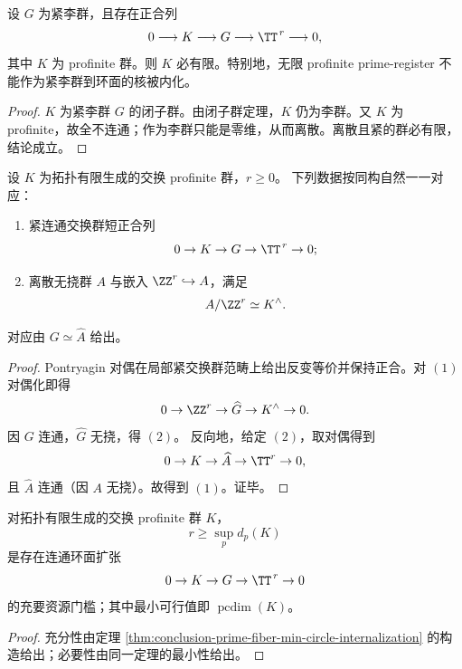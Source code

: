 

\begin{theorem}\label{thm:conclusion-compact-lie-profinite-kernel-obstruction}
设 \(G\) 为紧李群，且存在正合列
\[
0\longrightarrow K\longrightarrow G\longrightarrow \TT^{\,r}\longrightarrow 0,
\]
其中 \(K\) 为 profinite 群。则 \(K\) 必有限。特别地，无限 profinite prime-register 不能作为紧李群到环面的核被内化。
\end{theorem}
\begin{proof}
\(K\) 为紧李群 \(G\) 的闭子群。由闭子群定理，\(K\) 仍为李群。又 \(K\) 为 profinite，故全不连通；作为李群只能是零维，从而离散。离散且紧的群必有限，结论成立。
\end{proof}

\begin{theorem}\label{thm:conclusion-torus-extension-pontryagin-classification}
设 \(K\) 为拓扑有限生成的交换 profinite 群，\(r\ge 0\)。
下列数据按同构自然一一对应：
\begin{enumerate}
  \item 紧连通交换群短正合列
  \[
  0\to K\to G\to \TT^{\,r}\to 0;
  \]
  \item 离散无挠群 \(A\) 与嵌入 \(\ZZ^r\hookrightarrow A\)，满足
  \[
  A/\ZZ^r\simeq K^\wedge.
  \]
\end{enumerate}
对应由 \(G\simeq \widehat A\) 给出。
\end{theorem}
\begin{proof}
Pontryagin 对偶在局部紧交换群范畴上给出反变等价并保持正合。对 \((1)\) 对偶化即得
\[
0\to \ZZ^r\to \widehat G\to K^\wedge\to 0.
\]
因 \(G\) 连通，\(\widehat G\) 无挠，得 \((2)\)。
反向地，给定 \((2)\)，取对偶得到
\[
0\to K\to \widehat A\to \TT^r\to 0,
\]
且 \(\widehat A\) 连通（因 \(A\) 无挠）。故得到 \((1)\)。证毕。
\end{proof}

\begin{corollary}[圆维--素数剖面的资源边界完备性]\label{cor:conclusion-pcdim-resource-completeness}
对拓扑有限生成的交换 profinite 群 \(K\)，
\[
r\ge \sup_p d_p(K)
\]
是存在连通环面扩张
\[
0\to K\to G\to \TT^{\,r}\to 0
\]
的充要资源门槛；其中最小可行值即 \(\operatorname{pcdim}(K)\)。
\end{corollary}
\begin{proof}
充分性由定理 \ref{thm:conclusion-prime-fiber-min-circle-internalization} 的构造给出；必要性由同一定理的最小性给出。
\end{proof}

